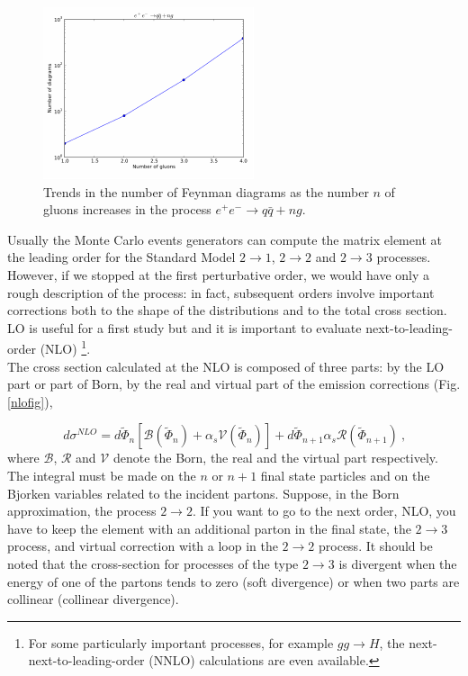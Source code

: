 \begin{figure}[h]
\centering
\includegraphics[scale= 2.5]{../Cap3/Fig_MC/fattoriale}
\caption{ Trends in the number of Feynman diagrams as the number $ n $ of gluons increases in the process $e^+ e^- \rightarrow q \bar{q} + ng$.}
\label{fatt}
\end{figure}
Usually the  Monte Carlo events generators can compute the matrix element at the leading order for the Standard Model $2 \rightarrow 1$,  $2 \rightarrow 2$  
and  $2 \rightarrow 3$ \cite{bib:madgraph} processes.  \\
However, if we stopped at the first perturbative order, we would have only a rough description of the process: in fact, subsequent orders involve important corrections both to the shape of the distributions and to the total cross section. LO is useful for a first study but and it is important to evaluate next-to-leading-order (NLO) \footnote{For some particularly important processes, for example $ gg \rightarrow H $, the next-next-to-leading-order (NNLO) calculations are even available.}. \\
The cross section calculated at the NLO is composed of three parts: by the LO part or part of Born, by the real and virtual part of the emission corrections (Fig. \ref{nlofig}),

\begin{equation}
 \label{xsecNLO}
 d\sigma^{NLO} =  d \tilde{\Phi}_n [\mathcal{B} (  \tilde{\Phi}_n  ) + \alpha_s \mathcal{V}(  \tilde{\Phi}_n  ) ] +  d \tilde{\Phi}_{n+1} \alpha_s \mathcal{R}(\tilde{\Phi}_{n+1}  ) \: \mbox{,}   \end{equation}
 where $\mathcal{B}$, $\mathcal{R}$ and $\mathcal{V}$  denote the Born, the real  and the virtual part respectively. The integral must be made on the $ n $ or $ n + 1 $ final state particles and on the Bjorken variables related to the incident partons.
Suppose, in the Born approximation, the process  $ 2 \rightarrow 2 $. If you want to go to the next order, NLO, you have to keep the element with an additional parton in the final state, the $ 2 \rightarrow 3 $ process, and virtual correction with a loop in the $ 2 \rightarrow 2 $ process.
It should be noted that the cross-section for processes of the type $ 2 \rightarrow 3 $ is divergent when the energy of one of the partons tends to zero (soft divergence) or when two parts are collinear (collinear divergence).


